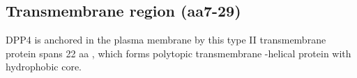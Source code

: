 \subsection{Transmembrane region (aa7-29)}

DPP4 is anchored in the plasma membrane by this type II transmembrane protein spans 22 aa , which forms polytopic transmembrane \alpha-helical protein with hydrophobic core.~\cite{Hong_1990}